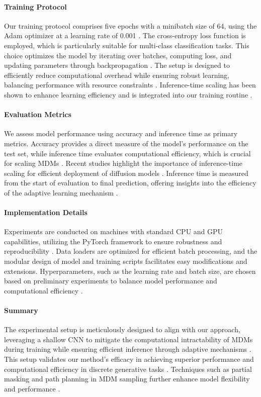 \documentclass{article} %
\begin{document}
\paragraph{Training Protocol} 
Our training protocol comprises five epochs with a minibatch size of 64, using the Adam optimizer at a learning rate of 0.001 \cite{diffusion2025}. The cross-entropy loss function is employed, which is particularly suitable for multi-class classification tasks. This choice optimizes the model by iterating over batches, computing loss, and updating parameters through backpropagation \cite{highfield2019}. The setup is designed to efficiently reduce computational overhead while ensuring robust learning, balancing performance with resource constraints \cite{a2023,steering2024,mdta2g2024}. Inference-time scaling has been shown to enhance learning efficiency and is integrated into our training routine \cite{improving2025}.

\paragraph{Evaluation Metrics} 
We assess model performance using accuracy and inference time as primary metrics. Accuracy provides a direct measure of the model's performance on the test set, while inference time evaluates computational efficiency, which is crucial for scaling MDMs \cite{masked2024,scaling2024,path2025}. Recent studies highlight the importance of inference-time scaling for efficient deployment of diffusion models \cite{improving2025}. Inference time is measured from the start of evaluation to final prediction, offering insights into the efficiency of the adaptive learning mechanism \cite{spg2025,beyond2025}.

\paragraph{Implementation Details} 
Experiments are conducted on machines with standard CPU and GPU capabilities, utilizing the PyTorch framework to ensure robustness and reproducibility \cite{dice2024}. Data loaders are optimized for efficient batch processing, and the modular design of model and training scripts facilitates easy modifications and extensions. Hyperparameters, such as the learning rate and batch size, are chosen based on preliminary experiments to balance model performance and computational efficiency \cite{nomad2023,genmol2025,llcaps2023}.

\paragraph{Summary} 
The experimental setup is meticulously designed to align with our approach, leveraging a shallow CNN to mitigate the computational intractability of MDMs during training while ensuring efficient inference through adaptive mechanisms \cite{diffusion2021}. This setup validates our method's efficacy in achieving superior performance and computational efficiency in discrete generative tasks \cite{masked2024,improving2025,hyperdiffusionfields2025,all2022}. Techniques such as partial masking and path planning in MDM sampling further enhance model flexibility and performance \cite{path2025,interactionbased2023}.
\end{document}
